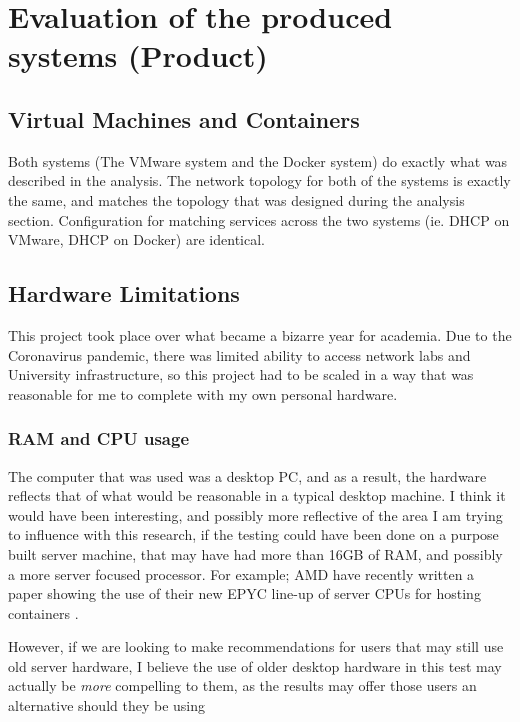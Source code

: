 
\chapter{Evaluation of the produced systems (Product)}
\section{Virtual Machines and Containers}%
Both systems (The VMware system and the Docker system) do exactly what was described in the analysis. The network topology for both of the systems is exactly the same, and matches the topology that was designed during the analysis section. Configuration for matching services  across the two systems (ie. DHCP on VMware, DHCP on Docker) are identical.

\section{Hardware Limitations}%
\label{HardwareLimitations}
This project took place over what became a bizarre year for academia. Due to the Coronavirus pandemic, there was limited ability to access network labs and University infrastructure, so this project had to be scaled in a way that was reasonable for me to complete with my own personal hardware.

\subsection{RAM and CPU usage}
\label{RAMCPU}
The computer that was used was a desktop PC, and as a result, the hardware reflects that of what would be reasonable in a typical desktop machine. I think it would have been interesting, and possibly more reflective of the area I am trying to influence with this research, if the testing could have been done on a purpose built server machine, that may have had more than 16GB of RAM, and possibly a more server focused processor. For example; AMD have recently written a paper showing the use of their new EPYC line-up of server CPUs for hosting containers \citep{amdcontainers}.

However, if we are looking to make recommendations for users that may still use old server hardware, I believe the use of older desktop hardware in this test may actually be \emph{more} compelling to them, as the results may offer those users an alternative should they be using 


